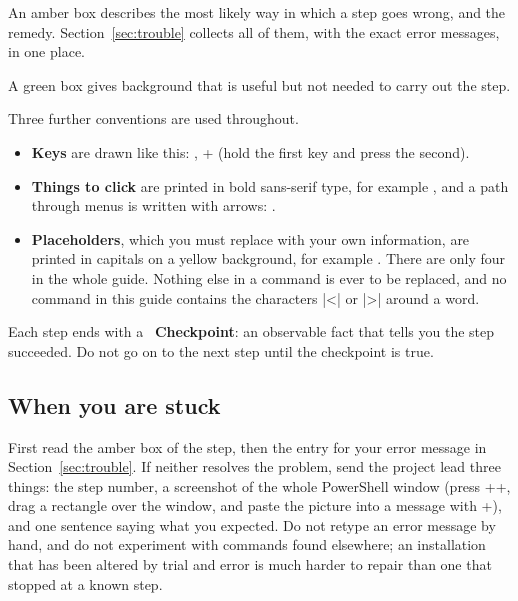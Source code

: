 \begin{iffail}
An amber box describes the most likely way in which a step goes wrong, and the remedy.
Section~\ref{sec:trouble} collects all of them, with the exact error messages, in one place.
\end{iffail}

\begin{note}
A green box gives background that is useful but not needed to carry out the step.
\end{note}

Three further conventions are used throughout.
\begin{itemize}
\item \textbf{Keys} are drawn like this: , + (hold the first key and
  press the second).
\item \textbf{Things to click} are printed in bold sans-serif type, for example , and
  a path through menus is written with arrows: \then{}\then{}.
\item \textbf{Placeholders}, which you must replace with your own information, are printed in
  capitals on a yellow background, for example . There are only four in the whole
  guide. Nothing else in a command is ever to be replaced, and no command in this guide contains
  the characters \code|<| or \code|>| around a word.
\end{itemize}

Each step ends with a \ok~\textbf{Checkpoint}: an observable fact that tells you the step
succeeded. Do not go on to the next step until the checkpoint is true.

\subsection{When you are stuck}
\label{sec:help}

First read the amber box of the step, then the entry for your error message in
Section~\ref{sec:trouble}. If neither resolves the problem, send the project lead three things:
the step number, a screenshot of the whole PowerShell window (press
++, drag a rectangle over the window, and paste the picture into
a message with +), and one sentence saying what you expected. Do not retype an
error message by hand, and do not experiment with commands found elsewhere; an installation that
has been altered by trial and error is much harder to repair than one that stopped at a known
step.
